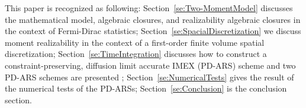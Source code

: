 This paper is recognized as following: Section~\ref{se:Two-MomentModel} discusses the mathematical model, algebraic closures, and realizability algebraic closures in the context of Fermi-Dirac statistics;
Section~\ref{se:SpacialDiscretization} we discuss moment realizability in the context of a first-order finite volume spatial discretization; Section~\ref{se:TimeIntegration} discusses how to construct a constraint-preserving, diffusion limit accurate IMEX (PD-ARS) scheme and two PD-ARS schemes are presented ; Section~\ref{se:NumericalTests} gives the result of the numerical tests of the PD-ARSs; Section~\ref{se:Conclusion} is the conclusion section.